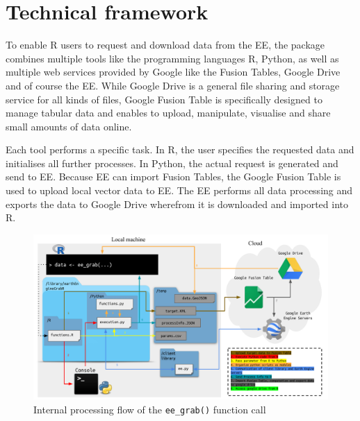 \section{Technical framework}

To enable R users to request and download data from the EE, the package combines multiple tools like the programming languages R, Python, as well as multiple web services provided by Google like the Fusion Tables, Google Drive and of course the EE. While Google Drive is a general file sharing and storage service for all kinds of files, Google Fusion Table is specifically designed to manage tabular data and enables to upload, manipulate, visualise and share small amounts of data online.

Each tool performs a specific task. In R, the user specifies the requested data and initialises all further processes. In Python, the actual request is generated and send to EE. Because EE can import Fusion Tables, the Google Fusion Table is used to upload local vector data to EE. The EE performs all data processing and exports the data to Google Drive wherefrom it is downloaded and imported into R. 

\begin{center}
	
	\begin{figure}[h]
		\begin{center}
			\includegraphics[width=15cm]{images/processin_folw.pdf}
			\caption{Internal processing flow of the \texttt{ee\_grab()} function call}
			\label{processingFlow}
		\end{center}
	\end{figure}
\end{center}


